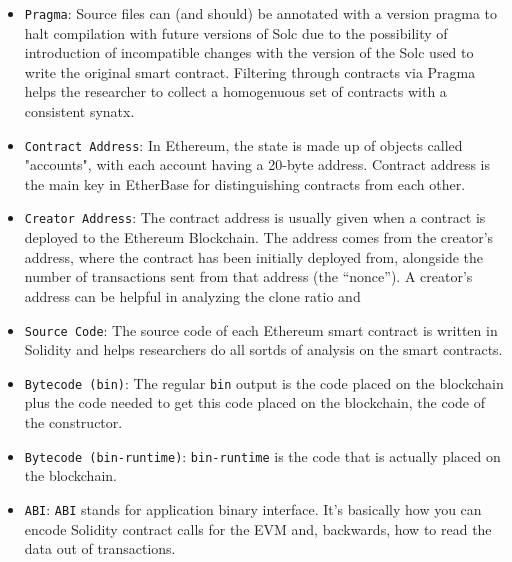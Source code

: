 	\begin{itemize}

		\item{\verb|Pragma|: Source files can (and should) be annotated with a version pragma to halt compilation with future versions of Solc due to the possibility of introduction of incompatible changes with the version of the Solc used to write the original smart contract. Filtering through contracts via Pragma helps the researcher to collect a homogenuous set of contracts with a consistent synatx.}\\

		\item{\verb|Contract Address|: In Ethereum, the state is made up of objects called "accounts", with each account having a 20-byte address. Contract address is the main key in EtherBase for distinguishing contracts from each other.}\\

		\item{\verb|Creator Address|: The contract address is usually given when a contract is deployed to the Ethereum Blockchain. The address comes from the creator's address, where the contract has been initially deployed from, alongside the number of transactions sent from that address (the “nonce”). A creator's address can be helpful in analyzing the clone ratio and }\\

		\item{\verb|Source Code|: The source code of each Ethereum smart contract is written in Solidity and helps researchers do all sortds of analysis on the smart contracts.}\\

		\item{\verb|Bytecode (bin)|: The regular \verb|bin| output is the code placed on the blockchain plus the code needed to get this code placed on the blockchain, the code of the constructor.}\\

		\item{\verb|Bytecode (bin-runtime)|: \verb|bin-runtime| is the code that is actually placed on the blockchain.}\\

		\item{\verb|ABI|: \verb|ABI| stands for application binary interface. It's basically how you can encode Solidity contract calls for the EVM and, backwards, how to read the data out of transactions.}\\


\end{itemize}

